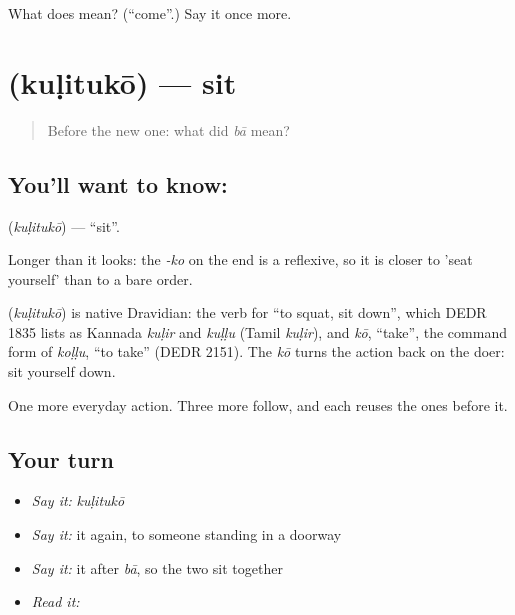 \begin{tcolorbox}[breakable,colback=teal!4,colframe=teal!35!black,title={Before you move on}]
What does  mean? (\textquotedblleft{}come\textquotedblright{}.) Say it once more.
\end{tcolorbox}
\section[\texorpdfstring{\kn{ಕುಳಿತುಕೋ} (kuḷitukō)}{ಕುಳಿತುಕೋ (kuḷitukō)}]{ (kuḷitukō) — sit}

\label{lesson:KA-C43-sit}



\begin{quote}
Before the new one: what did \emph{bā} mean?
\end{quote}

\subsection*{You'll want to know: }
\textbf{} (\emph{kuḷitukō}) — \textquotedblleft{}sit\textquotedblright{}.

Longer than it looks: the \emph{-ko} on the end is a reflexive, so it is closer to 'seat yourself' than to a bare order.

\begin{cousinweb}
\textbf{} (\emph{kuḷitukō}) is native Dravidian: the verb for \textquotedblleft{}to squat, sit down\textquotedblright{}, which DEDR 1835 lists as Kannada \emph{kuḷir} and \emph{kuḷḷu} (Tamil \emph{kuḷir}), and \emph{kō}, \textquotedblleft{}take\textquotedblright{}, the command form of \emph{koḷḷu}, \textquotedblleft{}to take\textquotedblright{} (DEDR 2151). The \emph{kō} turns the action back on the doer: sit yourself down.
\end{cousinweb}

\begin{grammarlens}[title={What you've built}]
One more everyday action. Three more follow, and each reuses the ones before it.
\end{grammarlens}

\subsection*{Your turn}
\begin{itemize}
\raggedright
  \item \emph{Say it:} \emph{kuḷitukō}
  \item \emph{Say it:} it again, to someone standing in a doorway
  \item \emph{Say it:} it after \emph{bā}, so the two sit together
  \item \emph{Read it:} \textbf{}
\end{itemize}

